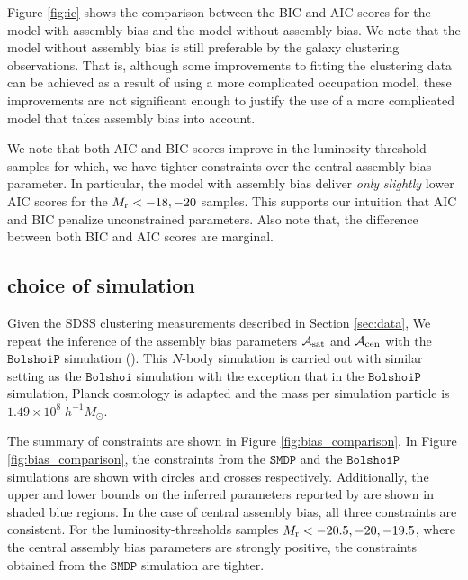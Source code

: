 \documentclass[twocolumn]{aastex61}
\newcommand{\acen}{\mathcal{A}_{\rm cen}}
\newcommand{\asat}{\mathcal{A}_{\rm sat}}
\begin{document}
Figure \ref{fig:ic} shows the comparison between the BIC and AIC scores for the model with assembly bias and the model without assembly bias. We note that the model without assembly bias is still preferable by the galaxy clustering observations. That is, although some improvements to fitting the clustering data can be achieved as a result of using a more complicated occupation model, these improvements are not significant enough to justify the use of a more complicated model that takes assembly bias into account. 

We note that both AIC and BIC scores improve in the luminosity-threshold samples for which, we have tighter constraints over the central assembly bias parameter. In particular, the model with assembly bias deliver \emph{only} \emph{slightly} lower AIC scores for the $M_{\rm r}<-18, -20$ samples. This supports our intuition that AIC and BIC penalize unconstrained parameters. Also note that, the difference between both BIC and AIC scores are marginal.

\subsection{choice of simulation}

Given the SDSS clustering measurements described in Section \ref{sec:data}, We repeat the inference of the assembly bias parameters $\asat$ and $\acen$ with the $\mathtt{BolshoiP}$ simulation (\citealt{smallmultidark}). This $N$-body simulation is carried out with similar setting as the $\mathtt{Bolshoi}$ simulation with the exception that in the $\mathtt{BolshoiP}$ simulation, Planck cosmology is adapted and the mass per simulation particle is $1.49\times 10^8 \; h^{-1} M_{\odot}$. 

The summary of constraints are shown in Figure \ref{fig:bias_comparison}. In Figure \ref{fig:bias_comparison}, the constraints from the $\mathtt{SMDP}$ and the $\mathtt{BolshoiP}$ simulations are shown with circles and crosses respectively. Additionally, the upper and lower bounds on the inferred parameters reported by \citet{zentner2016} are shown in shaded blue regions. In the case of central assembly bias, all three constraints are consistent. For the luminosity-thresholds samples $M_{\rm r}<-20.5, -20, -19.5$, where the central assembly bias parameters are strongly positive, the constraints obtained from the $\mathtt{SMDP}$ simulation are tighter. 
  
\end{document}

